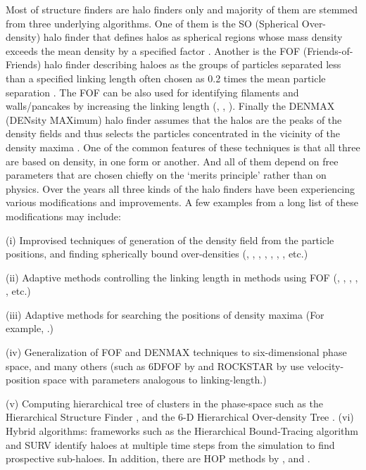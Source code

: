 \documentclass[fleqn,usenatbib,useAMS]{mnras}
\begin{document}
Most of structure finders are halo finders only and majority of them are stemmed from three underlying algorithms. One of them is the SO (Spherical Over-density) halo finder that defines halos  as spherical regions whose mass density exceeds the mean density by a specified factor \citep{Press1974}. 
Another is the FOF  (Friends-of-Friends) halo finder describing haloes  as the groups of particles separated less than a specified linking length often chosen as 0.2 times the mean particle separation \citep{Davis1985}. 
The FOF can be also used for identifying filaments and walls/pancakes by increasing the linking length (\citealt{Zeldovich1982}, \citealt{Shandarin1983a}, \citealt{Shandarin2010b}). Finally the DENMAX (DENsity MAXimum) halo finder assumes that the halos are the peaks of the density  fields and thus selects the particles concentrated in the vicinity of the density maxima \citep{Bertschinger1991}. One of the common features of these  techniques is that all three are based on density, in one form or another. And all of them depend on free parameters that are chosen chiefly on the `merits principle' \citep{Forero-Romero2009a} rather than on physics. Over the years all three kinds of the halo finders have been experiencing various modifications and improvements.  A few examples from a long list of these modifications may include: 


(i) Improvised techniques of generation of the density field from the particle positions, and finding spherically bound over-densities (\citealt{Lacey1994}, \citealt{Jenkins2001}, \citealt{Evrard2002}, \citealt{Weinberg1997}, \citealt{Neyrinck2005}, \citealt{Knollmann2009a}, \citealt{Sutter2010a}, \citealt{Planelles2010} etc.) 

(ii) Adaptive methods controlling the linking length in methods using FOF (\citealt{Davis1985}, \citealt{vanKampen1995}, \citealt{Gottlober1999}, \citealt{Springel2001a}, \citealt{Habib2009a}, \citealt{Rasera2010} etc.)

(iii) Adaptive methods for searching the positions of density maxima (For example, \citealt{Klypin1999}.)

(iv) Generalization of FOF and DENMAX techniques to six-dimensional phase space, and many others (such as 6DFOF by \citealt{Diemand2006} and ROCKSTAR by \citealt{Behroozi2013a} use velocity-position space with parameters analogous to linking-length.)

(v) Computing hierarchical tree of clusters in the phase-space such as the Hierarchical Structure Finder \cite{Maciejewski2009c}, and the 6-D Hierarchical Over-density Tree \cite{Ascasibar2010}. 
(vi) Hybrid algorithms: frameworks such as the Hierarchical Bound-Tracing algorithm \cite{Han2012a} and SURV \cite{Giocoli2010a} identify haloes at multiple time steps from the simulation to find prospective sub-haloes. In addition, there are HOP methods by \cite{Eisenstein1998}, \cite{Tweed2009} and \cite{Skory2010}. 
\end{document}
